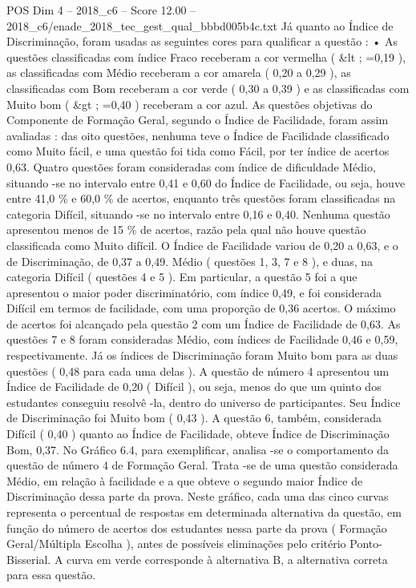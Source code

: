 \begin{textsample}{POS Dim 4 – 2018\_c6 – Score 12.00 – 2018\_c6/enade\_2018\_tec\_gest\_qual\_bbbd005b4c.txt}
Já quanto ao Índice de Discriminação, foram usadas as seguintes cores para qualificar a questão : • As questões classificadas com índice Fraco receberam a cor vermelha ( \&lt ; =0,19 ), as classificadas com Médio receberam a cor amarela ( 0,20 a 0,29 ), as classificadas com Bom receberam a cor verde ( 0,30 a 0,39 ) e as classificadas com Muito bom ( \&gt ; =0,40 ) receberam a cor azul.
As questões objetivas do Componente de Formação Geral, segundo o Índice de Facilidade, foram assim avaliadas : das oito questões, nenhuma teve o Índice de Facilidade classificado como Muito fácil, e uma questão foi tida como Fácil, por ter índice de acertos 0,63.
Quatro questões foram consideradas com índice de dificuldade Médio, situando -se no intervalo entre 0,41 e 0,60 do Índice de Facilidade, ou seja, houve entre 41,0 \% e 60,0 \% de acertos, enquanto três questões foram classificadas na categoria Difícil, situando -se no intervalo entre 0,16 e 0,40.
Nenhuma questão apresentou menos de 15 \% de acertos, razão pela qual não houve questão classificada como Muito difícil.
O Índice de Facilidade variou de 0,20 a 0,63, e o de Discriminação, de 0,37 a 0,49.
Médio ( questões 1, 3, 7 e 8 ), e duas, na categoria Difícil ( questões 4 e 5 ).
Em particular, a questão 5 foi a que apresentou o maior poder discriminatório, com índice 0,49, e foi considerada Difícil em termos de facilidade, com uma proporção de 0,36 acertos.
O máximo de acertos foi alcançado pela questão 2 com um Índice de Facilidade de 0,63.
As questões 7 e 8 foram consideradas Médio, com índices de Facilidade 0,46 e 0,59, respectivamente.
Já os índices de Discriminação foram Muito bom para as duas questões ( 0,48 para cada uma delas ).
A questão de número 4 apresentou um Índice de Facilidade de 0,20 ( Difícil ), ou seja, menos do que um quinto dos estudantes conseguiu resolvê -la, dentro do universo de participantes.
Seu Índice de Discriminação foi Muito bom ( 0,43 ).
A questão 6, também, considerada Difícil ( 0,40 ) quanto ao Índice de Facilidade, obteve Índice de Discriminação Bom, 0,37.
No Gráfico 6.4, para exemplificar, analisa -se o comportamento da questão de número 4 de Formação Geral.
Trata -se de uma questão considerada Médio, em relação à facilidade e a que obteve o segundo maior Índice de Discriminação dessa parte da prova.
Neste gráfico, cada uma das cinco curvas representa o percentual de respostas em determinada alternativa da questão, em função do número de acertos dos estudantes nessa parte da prova ( Formação Geral/Múltipla Escolha ), antes de possíveis eliminações pelo critério Ponto-Bisserial.
A curva em verde corresponde à alternativa B, a alternativa correta para essa questão.

\end{textsample}
